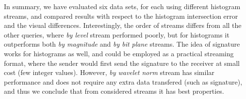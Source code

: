 In summary, we have evaluated six data sets, for each using different histogram streams, and
compared results with respect to the histogram intersection error and the visual differences. Interestingly, the
order of streams differs from all the other queries, where {\em by level} stream performed poorly, but for
histograms it outperforms both {\em by magnitude} and {\em by bit plane} streams.
The idea of signature works for histograms as well, and could be employed as a practical streaming
format, where the sender would first send the signature to the receiver at small cost (few integer
values). However, {\em by wavelet norm} stream has similar performance and does not require any extra
data transfered (such as signature), and thus we conclude that from
considered streams it has best properties.




